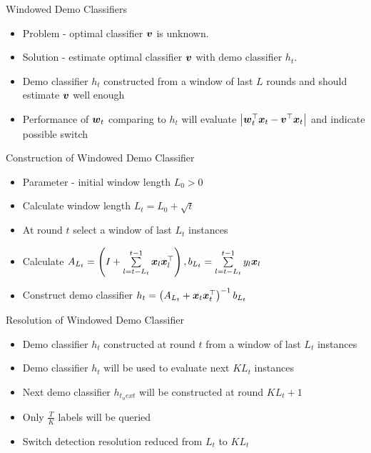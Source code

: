 \documentclass{beamer}
\begin{document}
\begin{frame}{Windowed Demo Classifiers}
\begin{itemize}
\item Problem - optimal classifier ${\boldsymbol{v}}$ is unknown.\newline
\item Solution - estimate optimal classifier ${\boldsymbol{v}}$ with demo classifier $h_t$. \newline
\item Demo classifier $h_t$  constructed from a window of last $L$ rounds and should estimate ${\boldsymbol{v}}$ well enough \newline
\item Performance of ${\boldsymbol{w}}_{t}$ comparing to $h_t$ will evaluate $\left\vert{{\boldsymbol{w}}}^{\top}_{t}{\boldsymbol{x}}_{t}-{{\boldsymbol{v}}}^{\top}{\boldsymbol{x}}_{t}\right\vert$ and indicate possible switch
\end{itemize}
\end{frame}


\begin{frame}{Construction of Windowed Demo Classifier}
\begin{itemize}
\item Parameter - initial window length $L_0>0$ \newline
\item Calculate window length $L_t=L_0+\sqrt{t}$\newline
\item At round $t$  select a window of last $L_t$ instances  \newline
\item Calculate $A_{L_t}=\left(I+\sum\limits_{l=t-L_t}^{t-1}{{\boldsymbol{x}}_{l}{{\boldsymbol{x}}}^{\top}_{l}}\right), b_{L_t}=\sum\limits_{l=t-L_t}^{t-1}y_l{\boldsymbol{x}}_{l}$ \newline
\item Construct demo classifier $h_t=\left(A_{L_t}+{\boldsymbol{x}}_{t}{{\boldsymbol{x}}}^{\top}_{t}\right)^{-1}b_{L_t}$
\end{itemize}
\end{frame}

\begin{frame}{Resolution of Windowed Demo Classifier}

\begin{itemize}
\item Demo classifier $h_t$ constructed at round $t$ from a window of last $L_t$ instances\newline
\item Demo classifier $h_t$ will be used to evaluate next  $KL_t$ instances\newline
\item Next demo classifier $h_{t_next}$ will be constructed at round $KL_t+1$\newline
\item Only $\frac{T}{K}$ labels will be queried\newline
\item Switch detection resolution reduced from $L_t$ to $KL_t$
\end{itemize}

\end{frame}
\end{document}
